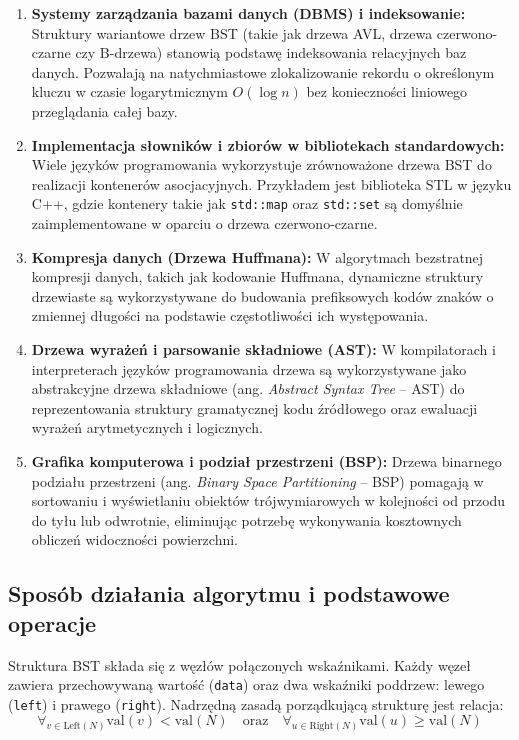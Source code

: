 \begin{enumerate}
    \item \textbf{Systemy zarządzania bazami danych (DBMS) i indeksowanie:}
    Struktury wariantowe drzew BST (takie jak drzewa AVL, drzewa czerwono-czarne czy B-drzewa) stanowią podstawę indeksowania relacyjnych baz danych. Pozwalają na natychmiastowe zlokalizowanie rekordu o określonym kluczu w czasie logarytmicznym $O(\log n)$ bez konieczności liniowego przeglądania całej bazy.
    
    \item \textbf{Implementacja słowników i zbiorów w bibliotekach standardowych:}
    Wiele języków programowania wykorzystuje zrównoważone drzewa BST do realizacji kontenerów asocjacyjnych. Przykładem jest biblioteka STL w języku C++, gdzie kontenery takie jak \texttt{std::map} oraz \texttt{std::set} są domyślnie zaimplementowane w oparciu o drzewa czerwono-czarne.
    
    \item \textbf{Kompresja danych (Drzewa Huffmana):}
    W algorytmach bezstratnej kompresji danych, takich jak kodowanie Huffmana, dynamiczne struktury drzewiaste są wykorzystywane do budowania prefiksowych kodów znaków o zmiennej długości na podstawie częstotliwości ich występowania.
    
    \item \textbf{Drzewa wyrażeń i parsowanie składniowe (AST):}
    W kompilatorach i interpreterach języków programowania drzewa są wykorzystywane jako abstrakcyjne drzewa składniowe (ang. \textit{Abstract Syntax Tree} -- AST) do reprezentowania struktury gramatycznej kodu źródłowego oraz ewaluacji wyrażeń arytmetycznych i logicznych.
    
    \item \textbf{Grafika komputerowa i podział przestrzeni (BSP):}
    Drzewa binarnego podziału przestrzeni (ang. \textit{Binary Space Partitioning} -- BSP) pomagają w sortowaniu i wyświetlaniu obiektów trójwymiarowych w kolejności od przodu do tyłu lub odwrotnie, eliminując potrzebę wykonywania kosztownych obliczeń widoczności powierzchni.
\end{enumerate}

\subsection{Sposób działania algorytmu i podstawowe operacje}

\hspace{0.60cm}
Struktura BST składa się z węzłów połączonych wskaźnikami. Każdy węzeł zawiera przechowywaną wartość (\texttt{data}) oraz dwa wskaźniki poddrzew: lewego (\texttt{left}) i prawego (\texttt{right}). Nadrzędną zasadą porządkującą strukturę jest relacja:
\begin{equation}
    \forall_{v \in \text{Left}(N)} \text{val}(v) < \text{val}(N) \quad \text{oraz} \quad \forall_{u \in \text{Right}(N)} \text{val}(u) \ge \text{val}(N)
\end{equation}

